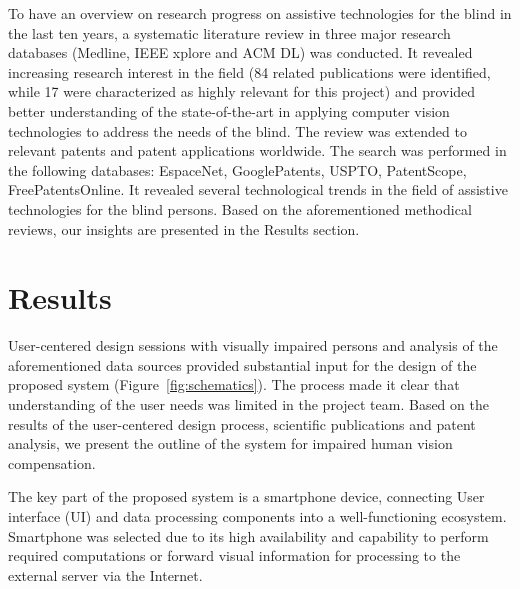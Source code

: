 \documentclass[10pt,conference,compsocconf]{IEEEtran}
\begin{document}
To have an overview on research progress on assistive technologies for the blind in the last ten years, a systematic literature review in three major research databases (Medline, IEEE xplore and ACM DL) was conducted. It revealed increasing research interest in the field (84 related publications were identified, while 17 were characterized as highly relevant for this project) and provided better understanding of the state-of-the-art in applying computer vision technologies to address the needs of the blind. 
The review was extended to relevant patents and patent applications worldwide. The search was performed in the following databases: EspaceNet, GooglePatents, USPTO, PatentScope, FreePatentsOnline. It revealed several technological trends in the field of assistive technologies for the blind persons.
Based on the aforementioned methodical reviews, our insights are presented in the Results section.




\section{Results}
\label{sec:results}

User-centered design sessions with visually impaired persons and analysis of the aforementioned data sources provided substantial input for the design of the proposed system (Figure~\ref{fig:schematics}). The process made it clear that understanding of the user needs was limited in the project team. Based on the results of the user-centered design process, scientific publications and patent analysis, we present the outline of the system for impaired human vision compensation. 

The key part of the proposed system is a smartphone device, connecting User interface (UI) and data processing components into a well-functioning ecosystem. Smartphone was selected due to its high availability and capability to perform required computations or forward visual information for processing to the external server via the Internet.
\end{document}
